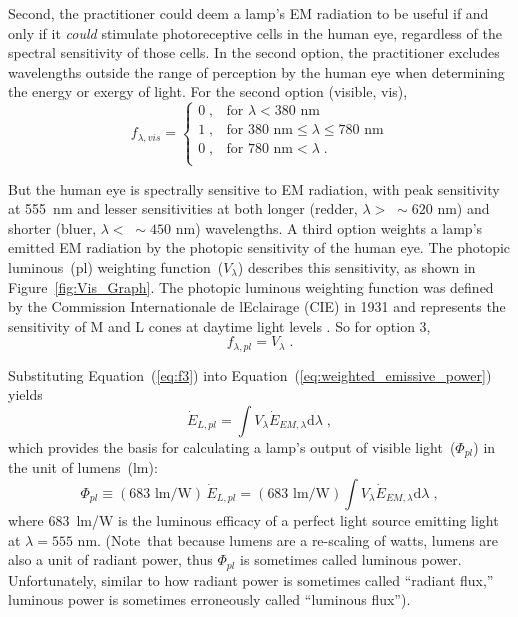 \documentclass[energies,article,accept,moreauthors,pdftex]{Definitions/mdpi}\usepackage[]{graphicx}\usepackage[]{color}
\newcommand{\del}[1]{}
\newcommand{\enoex}{energy or exergy}
\providecommand{\DIFdelbegin}{} %
\providecommand{\DIFdelend}{} %
\newcommand{\DIFscaledelfig}{0.5}
\newlength{\DIFdelgraphicswidth} %
\newlength{\DIFdelgraphicsheight} %
\newcommand{\DIFdelincludegraphics}[2][]{%
\sbox{\DIFdelgraphicsbox}{\DIFOincludegraphics[#1]{#2}}%
\settoboxwidth{\DIFdelgraphicswidth}{\DIFdelgraphicsbox} %
\settoboxtotalheight{\DIFdelgraphicsheight}{\DIFdelgraphicsbox} %
\scalebox{\DIFscaledelfig}{%
\parbox[b]{\DIFdelgraphicswidth}{\usebox{\DIFdelgraphicsbox}\\[-\baselineskip] \rule{\DIFdelgraphicswidth}{0em}}\llap{\resizebox{\DIFdelgraphicswidth}{\DIFdelgraphicsheight}{%
\setlength{\unitlength}{\DIFdelgraphicswidth}%
\begin{picture}(1,1)%
\thicklines\linethickness{2pt} %
{\color[rgb]{1,0,0}\put(0,0){\framebox(1,1){}}}%
{\color[rgb]{1,0,0}\put(0,0){\line( 1,1){1}}}%
{\color[rgb]{1,0,0}\put(0,1){\line(1,-1){1}}}%
\end{picture}%
}\hspace*{3pt}}} %
} %
\DeclareRobustCommand{\DIFdelbegin}{\DIFOdelbegin \let\includegraphics\DIFdelincludegraphics} %
\DeclareRobustCommand{\DIFdelend}{\DIFOaddend \let\includegraphics\DIFOincludegraphics} %
\begin{document}
Second, the practitioner could 
deem a lamp's EM radiation to be useful if and only if it \emph{could}
stimulate photoreceptive cells in the human eye,
regardless of the spectral sensitivity of those cells.
In the second option, the practitioner excludes wavelengths outside the range of perception by the human eye
when determining the \enoex{} of light.
For the second option (visible, vis),
\begin{equation} \label{eq:f2}
f_{\lambda,vis} =
  \begin{cases}
    0 \; , & \text{for } \lambda < 380 \text{ nm} \\
    1 \; , & \text{for } 380 \text{ nm} \le \lambda \le 780 \text{ nm} \\
    0 \; , & \text{for } 780 \text{ nm} < \lambda \; . \\
  \end{cases} 
\end{equation}

But the human eye is spectrally sensitive to EM radiation, 
with peak sensitivity at 555~nm 
\DIFdelbegin %
\DIFdelend and lesser sensitivities at both 
longer (redder, $\lambda > \; \sim{}620 \text{ nm}$) and
shorter (bluer, $\lambda < \; \sim{}450 \text{ nm}$) wavelengths.
A third option weights a lamp's emitted EM radiation 
by the photopic sensitivity of the human eye.
The photopic luminous~(pl) weighting function~($V_\lambda$) describes this sensitivity, 
as shown in Figure~\ref{fig:Vis_Graph}.
The photopic luminous weighting function 
was defined by the Commission Internationale de l\textquotesingle{}Eclairage (CIE) in 1931
and represents the sensitivity of M and L cones
at daytime light levels \cite{CVRL2008}.
So for option 3,
\begin{equation} \label{eq:f3}
  f_{\lambda,pl} = V_\lambda \; .
\end{equation}

Substituting Equation~(\ref{eq:f3}) into Equation~(\ref{eq:weighted_emissive_power})
yields
\begin{equation}
  \dot{E}_{L,pl} = \int V_\lambda \dot{E}_{EM,\lambda} \mathrm{d}\lambda \; ,
\end{equation}
%
which provides the basis for calculating a lamp's output 
of visible light~($\Phi_{pl}$) in the unit of lumens~(lm):
\begin{equation} \label{eq:lumen}
  \Phi_{pl} \equiv (683 \text{ lm/W}) \, \dot{E}_{L,pl} 
                 = (683 \text{ lm/W}) \int V_\lambda \dot{E}_{EM,\lambda} \mathrm{d}\lambda \; ,
\end{equation}
%
where 683~lm/W is the luminous efficacy of a perfect light source
emitting \DIFdelbegin %
\DIFdelend light at $\lambda = 555 \text{ nm}$.
\mbox{(Note that} because lumens are a re-scaling of watts, 
lumens are also a unit of radiant power, 
thus $\Phi_{pl}$ is sometimes called luminous power. 
Unfortunately, similar to how radiant power is sometimes called ``radiant flux,'' 
luminous power is sometimes erroneously called ``luminous flux'').
\end{document}
